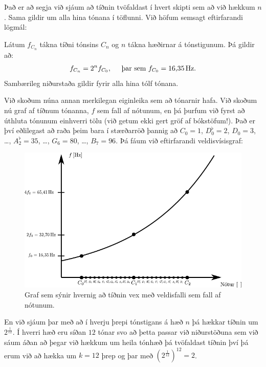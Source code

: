 \ifdefined \wholebook \else\documentclass[oneside]{book}\usepackage{EdlBook}\graphicspath{{figures/}}
\begin{document}
Það er að segja við sjáum að tíðnin tvöfaldast í hvert skipti sem að við hækkum $n$. Sama gildir um alla hina tónana í töflunni. Við höfum semsagt eftirfarandi lögmál:

\begin{tcolorbox}
\begin{theorem}
Látum $f_{C_n}$ tákna tíðni tónsins $C_n$ og $n$ tákna hæðirnar á tónstigunum. Þá gildir að:
\begin{align*}
    f_{C_n} = 2^{n}f_{C_0}, \hspace{0.5cm} \text{þar sem $f_{C_0} = \SI{16.35}{Hz}$.}
\end{align*}
Sambærileg niðurstaða gildir fyrir alla hina tólf tónana.
\end{theorem}
\end{tcolorbox}

\newpage

Við skoðum núna annan merkilegan eiginleika sem að tónarnir hafa. Við skoðum nú graf af tíðnum tónanna, $f$ sem fall af nótunum, en þá þurfum við fyrst að úthluta tónunum einhverri tölu (við getum ekki gert gröf af bókstöfum!). Það er því eðlilegast að raða þeim bara í stærðarröð þannig að $C_0 = 1$, $D^\flat_0 = 2$, $D_0 = 3$, \ldots, $A^\flat_2 = 35$, \ldots, $G_6 = 80$, \ldots, $B_7 = 96$. Þá fáum við eftirfarandi veldisvísisgraf:

\begin{figure}[H]
    \centering
    \includegraphics{figures/music-notes.pdf}
    \caption{Graf sem sýnir hvernig að tíðnin vex með veldisfalli sem fall af nótunum.}
    \label{fig:my_label}
\end{figure}
En við sjáum þar með að í hverju þrepi tónstigans á hæð $n$ þá hækkar tíðnin um $2^{\frac{1}{12}}$. Í hverri hæð eru síðan $12$ tónar svo að þetta passar við niðurstöðuna sem við sáum áðan að þegar við hækkum um heila tónhæð þá tvöfaldast tíðnin því þá erum við að hækka um $k = 12$ þrep og þar með $\left(2^{\frac{1}{12}}\right)^{12} = 2$.
\end{document}
